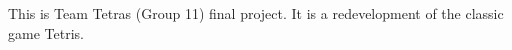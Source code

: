 This is Team Tetra\textquotesingle{}s (Group 11) final project. It is a redevelopment of the classic game Tetris. 